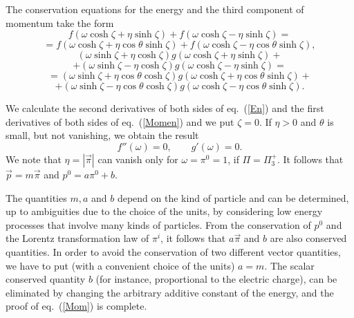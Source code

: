 \documentclass[a4paper,12pt]{article}
\begin{document}
The conservation equations for the energy and the third component of momentum take the form
\begin{displaymath}
f(\omega \cosh\zeta + \eta \sinh\zeta) + f(\omega \cosh\zeta - \eta \sinh\zeta) =
\end{displaymath}
\begin{equation} \label{En}
= f(\omega \cosh\zeta + \eta \cos\theta \sinh\zeta) + f(\omega \cosh\zeta - \eta \cos\theta \sinh\zeta),
\end{equation}
\begin{displaymath}
(\omega \sinh\zeta +\eta \cosh\zeta) g(\omega \cosh\zeta + \eta \sinh\zeta) +
\end{displaymath}
\begin{displaymath}
+ (\omega \sinh\zeta - \eta \cosh\zeta) g(\omega \cosh\zeta - \eta \sinh\zeta) =
\end{displaymath}
\begin{displaymath}
= (\omega \sinh\zeta +\eta \cos\theta \cosh\zeta) g(\omega \cosh\zeta + \eta \cos\theta \sinh\zeta) +
\end{displaymath}
\begin{equation} \label{Momen}
+ (\omega \sinh\zeta - \eta \cos\theta \cosh\zeta) g(\omega \cosh\zeta - \eta \cos\theta \sinh\zeta).
\end{equation}

We calculate the second derivatives of both sides of eq.\ (\ref{En}) and the first derivatives of both sides of eq.\ (\ref{Momen}) and we put $\zeta = 0$. If $\eta > 0$ and $\theta$ is small, but not vanishing, we obtain the result
\begin{equation} 
f''(\omega) = 0, \qquad  g'(\omega) = 0.
\end{equation}
We note that $\eta = |\vec\pi|$ can vanish only for $\omega = \pi^0 = 1$, if $\Pi = \Pi_3^+$.  It follows that $\vec p = m \vec\pi$ and $p^0 = a \pi^0 + b$. 

The quantities $m, a$ and $b$ depend on the kind of particle and can be determined, up to ambiguities due to the choice of the units, by considering low energy processes that involve many kinds of particles.  From the conservation of $p^0$ and the Lorentz transformation law of $\pi^i$, it follows that $a \vec\pi$ and $b$ are also conserved quantities. In order to avoid the conservation of two different vector quantities, we have to put (with a convenient choice of the units) $a = m$. The scalar conserved quantity $b$ (for instance, proportional to the electric charge), can be eliminated by changing the arbitrary additive constant of the energy, and the proof of eq.\ (\ref{Mom}) is complete.
\end{document}
